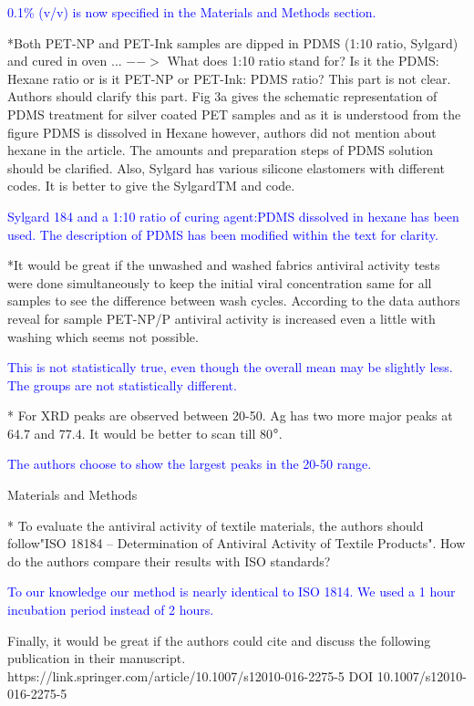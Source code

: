\documentclass[12pt]{letter}
\newcommand{\blue}[1]{\textcolor{blue}{#1}} %
\begin{document}
\blue{0.1\% (v/v) is now specified in the Materials and Methods section. }

*Both PET-NP and PET-Ink samples are dipped in PDMS (1:10 ratio, Sylgard) and cured in oven ... $-->$ What does 1:10 ratio stand for? Is it the PDMS: Hexane ratio or is it PET-NP or PET-Ink: PDMS ratio? This part is not clear. Authors should clarify this part. Fig 3a gives the schematic representation of PDMS treatment for silver coated PET samples and as it is understood from the figure PDMS is dissolved in Hexane however, authors did not mention about hexane in the article. The amounts and preparation steps of PDMS solution should be clarified. Also, Sylgard has various silicone elastomers with different codes. It is better to give the SylgardTM and code.

\blue{Sylgard 184 and a 1:10 ratio of curing agent:PDMS dissolved in hexane has been used. The description of PDMS has been modified within the text for clarity. }

*It would be great if the unwashed and washed fabrics antiviral activity tests were done simultaneously to keep the initial viral concentration same for all samples to see the difference between wash cycles. According to the data authors reveal for sample PET-NP/P antiviral activity is increased even a little with washing which seems not possible.

\blue{This is not statistically true, even though the overall mean may be slightly less. The groups are not statistically different.}

* For XRD peaks are observed between 20-50. Ag has two more major peaks at 64.7 and 77.4. It would be better to scan till 80$\degree$.

\blue{The authors choose to show the largest peaks in the 20-50 range. }

Materials and Methods

* To evaluate the antiviral activity of textile materials, the authors should follow"ISO 18184 – Determination of Antiviral Activity of Textile Products". How do the authors compare their results with ISO standards?

\blue{To our knowledge our method is nearly identical to ISO 1814. We used a 1 hour incubation period instead of 2 hours.}

Finally, it would be great if the authors could cite and discuss the following publication in their manuscript. https://link.springer.com/article/10.1007/s12010-016-2275-5
DOI 10.1007/s12010-016-2275-5
\end{document}
